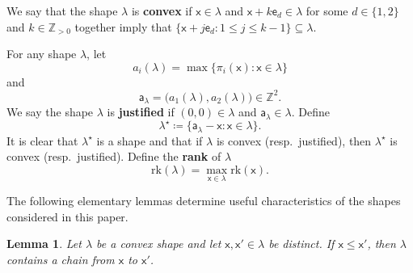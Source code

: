 \documentclass[12pt]{amsart}
\newcommand{\x}{\ensuremath{\mathsf{x}}}
\newcommand{\e}{\ensuremath{\mathsf{e}}}
\newcommand{\aaa}{\ensuremath{\mathsf{a}}}
\newtheorem{lemma}[theorem]{Lemma}
\theoremstyle{definition}
\theoremstyle{remark}
\numberwithin{equation}{section}
\newcommand{\rank}{\ensuremath{\mathrm{rk}}}
\begin{document}
We say that the shape $\lambda$ is {\bf convex} if $\x\in \lambda$ and $\x + k  \e_d \in \lambda $ for some $d \in \{1, 2\}$ and $k \in \mathbb{Z}_{> 0}$ together imply  that $\{\x + j \e_d : 1 \leq j \leq k-1 \} \subseteq \lambda.$

For any shape $\lambda$, let \[a_i(\lambda) = \max \{ \pi_i(\x) \colon \x \in \lambda\}\] and \[\aaa_\lambda = \big(a_1(\lambda),a_{2}(\lambda)\big) \in \mathbb{Z}^2.\] We say the shape $\lambda$ is {\bf justified} if $(0,0) \in \lambda$ and $\aaa_{\lambda} \in \lambda$. Define 
\[
\lambda^\star \coloneqq \lbrace \aaa_\lambda - \x: \x \in \lambda \rbrace.
\] It is clear that $\lambda^{\star}$ is a shape and that if $\lambda$ is convex (resp.\ justified), then $\lambda^\star$ is convex (resp.\ justified).  Define the {\bf rank} of $\lambda$ 
\[ 
\rank(\lambda) = \max_{\x \in \lambda} \rank(\x).
\]

The following elementary lemmas determine useful characteristics of the shapes considered in this paper. 

\begin{lemma} \label{lem:convex_chain}
Let $\lambda$ be a convex shape and let $\x,\x' \in \lambda$ be distinct. If $\x \leq \x'$, then $\lambda$ contains a chain from $\x$ to $\x'$. 
\end{lemma}
\end{document}

